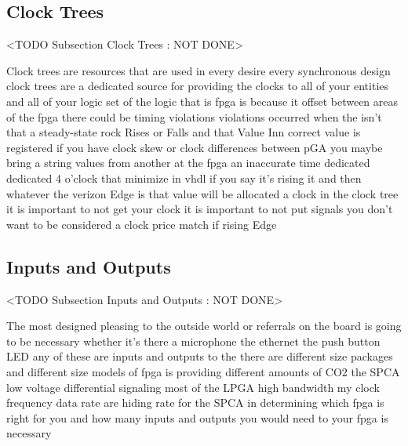 \subsection{Clock Trees}
	<TODO Subsection Clock Trees : NOT DONE>

Clock trees are resources that are used in every desire every synchronous design clock trees are a dedicated source for providing the clocks to all of your entities and all of your logic set of the logic that is fpga is because it offset between areas of the fpga there could be timing violations violations occurred when the isn't that a steady-state rock Rises or Falls and that Value Inn correct value is registered if you have clock skew or clock differences between pGA you maybe bring a string values from another at the fpga an inaccurate time dedicated dedicated 4 o'clock that minimize in vhdl if you say it's rising it and then whatever the verizon Edge is that value will be allocated a clock in the clock tree it is important to not get your clock it is important to not put signals you don't want to be considered a clock price match if rising Edge

\subsection{Inputs and Outputs}
	<TODO Subsection Inputs and Outputs : NOT DONE>

The most designed pleasing to the outside world or referrals on the board is going to be necessary whether it's there a microphone the ethernet the push button LED any of these are inputs and outputs to the there are different size packages and different size models of fpga is providing different amounts of CO2 the SPCA low voltage differential signaling most of the LPGA high bandwidth my clock frequency data rate are hiding rate for the SPCA in determining which fpga is right for you and how many inputs and outputs you would need to your fpga is necessary

